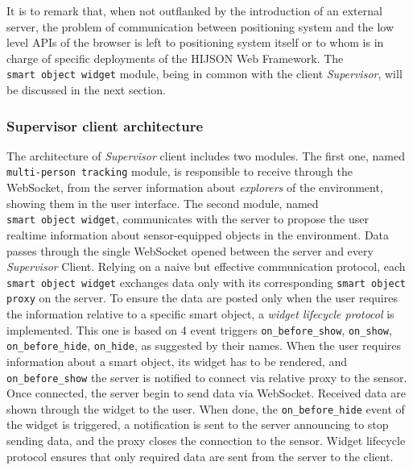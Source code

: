 It is to remark that, when not outflanked by the introduction of an external
server, the problem of communication between positioning system and the low
level APIs of the browser is left to positioning system itself or to whom is
in charge of specific deployments of the HIJSON Web Framework.
The \texttt{smart\ object\ widget} module, being in common with the
client \emph{Supervisor}, will be discussed in the next section.

\subsubsection{Supervisor client architecture}\label{supervisor-client-architecture}

The architecture of \emph{Supervisor} client includes two modules. The first
one, named {\tt multi-person\ tracking} module, is responsible to
receive through the WebSocket, from the server information about
\emph{explorers} of the environment, showing them in the user interface. The
second module, named {\tt smart\ object\ widget}, communicates with the
server to propose the user realtime information about sensor-equip\-ped
objects in the environment. Data passes through the single WebSocket
opened between the server and every \emph{Supervisor} Client. Relying on a
naive but effective communication protocol, each {\tt smart object widget}
exchanges data only with its corresponding {\tt smart object proxy} on the server. To
ensure the data are posted only when the user requires the information
relative to a specific smart object, a \emph{widget lifecycle protocol} is
implemented. This one is based on 4 event triggers {\tt on\_before\_show},
{\tt on\_show}, {\tt on\_before\_hide}, {\tt on\_hide}, as suggested by their names.
When the user requires information about a smart object, its widget has
to be rendered, and {\tt on\_before\_show} the server is notified to
connect via relative proxy to the sensor. Once connected, the server
begin to send data via WebSocket. Received data are shown through the
widget to the user. When done, the {\tt on\_before\_hide} event of the
widget is triggered, a notification is sent to the server announcing to stop sending
data, and the proxy closes the connection to the sensor. Widget lifecycle
protocol ensures that only required data are sent from the server to the
client.
